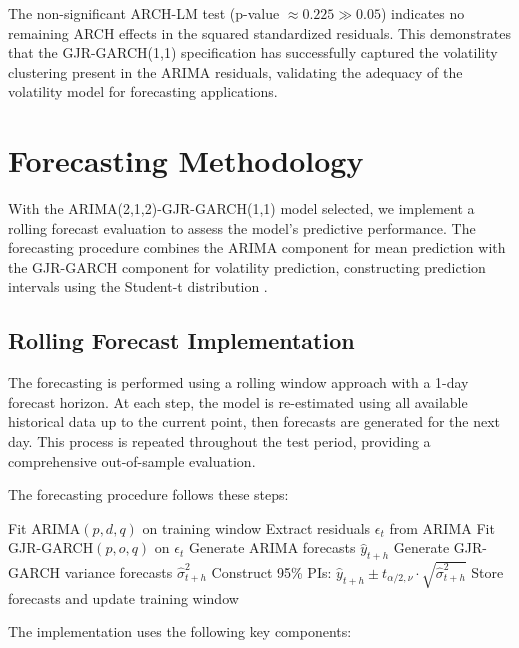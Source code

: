 \documentclass[letterpaper]{article} %
\begin{document}
The non-significant ARCH-LM test (p-value $\approx 0.225 \gg 0.05$) indicates no remaining ARCH effects in the squared standardized residuals. This demonstrates that the GJR-GARCH(1,1) specification has successfully captured the volatility clustering present in the ARIMA residuals, validating the adequacy of the volatility model for forecasting applications.

\section{Forecasting Methodology}

With the ARIMA(2,1,2)-GJR-GARCH(1,1) model selected, we implement a rolling forecast evaluation to assess the model's predictive performance. The forecasting procedure combines the ARIMA component for mean prediction with the GJR-GARCH component for volatility prediction, constructing prediction intervals using the Student-t distribution \cite{bollerslev1986}.

\subsection{Rolling Forecast Implementation}

The forecasting is performed using a rolling window approach with a 1-day forecast horizon. At each step, the model is re-estimated using all available historical data up to the current point, then forecasts are generated for the next day. This process is repeated throughout the test period, providing a comprehensive out-of-sample evaluation.

The forecasting procedure follows these steps:

\begin{algorithm}
\caption{Rolling ARIMA-GJR-GARCH Forecasting Procedure}
\label{alg:forecast_procedure}
\begin{algorithmic}
\STATE Fit ARIMA$(p,d,q)$ on training window
\STATE Extract residuals $\epsilon_t$ from ARIMA
\STATE Fit GJR-GARCH$(p,o,q)$ on $\epsilon_t$
\STATE Generate ARIMA forecasts $\hat{y}_{t+h}$
\STATE Generate GJR-GARCH variance forecasts $\hat{\sigma}_{t+h}^2$
\STATE Construct 95\% PIs: $\hat{y}_{t+h} \pm t_{\alpha/2,\nu} \cdot \sqrt{\hat{\sigma}_{t+h}^2}$
\STATE Store forecasts and update training window
\end{algorithmic}
\end{algorithm}

The implementation uses the following key components:
\end{document}
